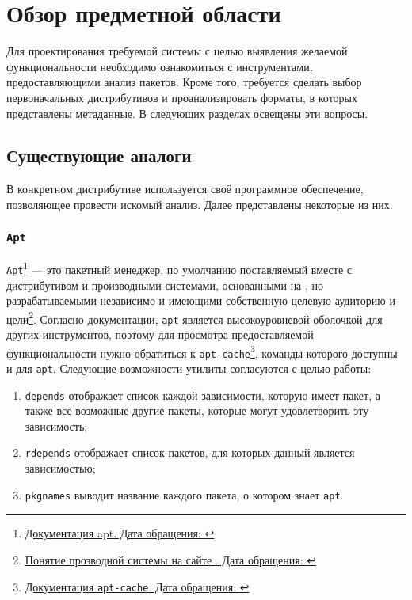 
\section{Обзор предметной области}
\label{sec:relatedworks}
Для проектирования требуемой системы с целью выявления желаемой функциональности необходимо ознакомиться с инструментами, предоставляющими анализ пакетов.
Кроме того, требуется сделать выбор первоначальных дистрибутивов и проанализировать форматы, в которых представлены метаданные.
В следующих разделах освещены эти вопросы.

\subsection{Существующие аналоги}
В конкретном дистрибутиве используется своё программное обеспечение, позволяющее провести искомый анализ.
Далее представлены некоторые из них.

\subsubsection{\texttt{Apt}}
\texttt{Apt}\footnote{\href{https://manpages.debian.org/stretch/apt/apt.8.en.html\#SCRIPT_USAGE_AND_DIFFERENCES_FROM_OTHER_APT_TOOLS/}{Документация apt. Дата обращения: }} --- это пакетный менеджер, по умолчанию поставляемый вместе с дистрибутивом {\debian} и производными системами, основанными на {\debian}, но разрабатываемыми независимо и имеющими собственную целевую аудиторию и цели\footnote{\href{https://www.debian.org/derivatives/}{Понятие прозводной системы на сайте {\debian}. Дата обращения: }}.
Согласно документации, \texttt{apt} является высокоуровневой оболочкой для других инструментов, поэтому для просмотра предоставляемой функциональности нужно обратиться к \texttt{apt-cache}\footnote{\href{https://manpages.debian.org/stretch/apt/apt-cache.8.en.html}{Документация \texttt{apt-cache}. Дата обращения: }}, команды которого доступны и для \texttt{apt}.
Следующие возможности утилиты согласуются с целью работы:
\begin{enumerate}
	\item \texttt{depends} отображает список каждой зависимости, которую имеет пакет, а также все возможные другие пакеты, которые могут удовлетворить эту зависимость;
	\item \texttt{rdepends} отображает список пакетов, для которых данный является зависимостью;
	\item \texttt{pkgnames} выводит название каждого пакета, о котором знает \texttt{apt}.
\end{enumerate}

